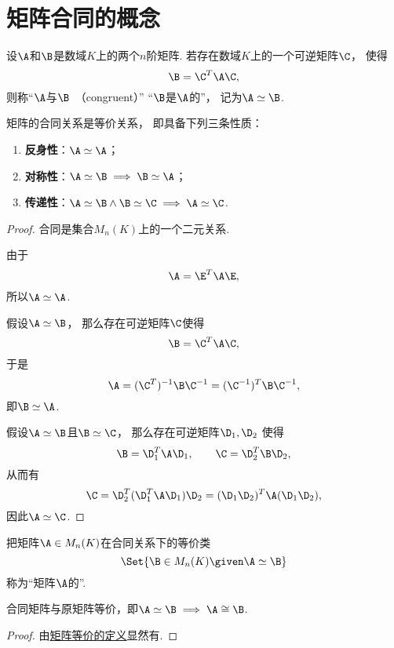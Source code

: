 \section{矩阵合同的概念}
\begin{definition}
设\(\A\)和\(\B\)是数域\(K\)上的两个\(n\)阶矩阵.
若存在数域\(K\)上的一个可逆矩阵\(\C\)，
使得\[
	\B=\C^T\A\C,
\]
则称“\(\A\)与\(\B\)~（congruent）”
“\(\B\)是\(\A\)的”，
记为\(\A\simeq\B\).
\end{definition}

\begin{property}
矩阵的合同关系是等价关系，
即具备下列三条性质：\begin{enumerate}
	\item {\rm\bf 反身性}：\(\A\simeq\A\)；
	\item {\rm\bf 对称性}：\(\A\simeq\B \implies \B\simeq\A\)；
	\item {\rm\bf 传递性}：\(\A\simeq\B \land \B\simeq\C \implies \A\simeq\C\).
\end{enumerate}
\begin{proof}
合同是集合\(M_n(K)\)上的一个二元关系.

由于\[
	\A = \E^T \A \E,
\]
所以\(\A \simeq \A\).

假设\(\A \simeq \B\)，
那么存在可逆矩阵\(\C\)使得\[
	\B=\C^T\A\C,
\]
于是\[
	\A=(\C^T)^{-1}\B\C^{-1}
	=(\C^{-1})^T\B\C^{-1},
\]
即\(\B \simeq \A\).

假设\(\A \simeq \B\)且\(\B \simeq \C\)，
那么存在可逆矩阵\(\D_1,\D_2\)
使得\[
	\B = \D_1^T \A \D_1, \qquad
	\C = \D_2^T \B \D_2,
\]
从而有\[
	\C = \D_2^T (\D_1^T \A \D_1) \D_2
	= (\D_1 \D_2)^T \A (\D_1 \D_2),
\]
因此\(\A \simeq \C\).
\end{proof}
\end{property}

\begin{definition}
把矩阵\(\A \in M_n(K)\)在合同关系下的等价类\[
	\Set{ \B \in M_n(K) \given \A \simeq \B }
\]称为“矩阵\(\A\)的”.
\end{definition}

\begin{property}
合同矩阵与原矩阵等价，即\(\A\simeq\B \implies \A\cong\B\).
\begin{proof}
由\hyperref[definition:逆矩阵.矩阵等价]{矩阵等价的定义}显然有.
\end{proof}
\end{property}

